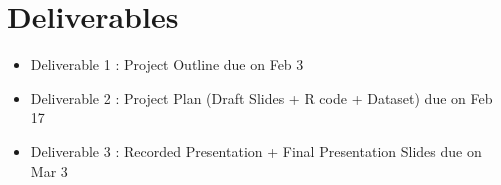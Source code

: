 \documentclass[12pt]{article}
\begin{document}

\section*{Deliverables}
\begin{itemize}
    \item Deliverable 1 : Project Outline due on Feb 3
    \item Deliverable 2 : Project Plan (Draft Slides + R code + Dataset) due on Feb 17
    \item Deliverable 3 : Recorded Presentation + Final Presentation Slides due on Mar 3
\end{itemize}
\end{document}
